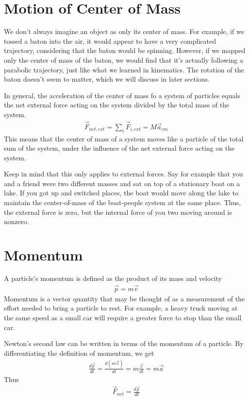 \documentclass[11pt]{article}
\begin{document}
\section{Motion of Center of Mass}

We don't always imagine an object as only its center of mass. For example, if we tossed a baton into the air, it would appear to have a very complicated trajectory, considering that the baton would be spinning. However, if we mapped only the center of mass of the baton, we would find that it's actually following a parabolic trajectory, just like what we learned in kinematics. The rotation of the baton doesn't seem to matter, which we will discuss in later sections.

In general, the acceleration of the center of mass fo a system of particles equals the net external force acting on the system divided by the total mass of the system. 
\begin{align*}
    \Vec{F}_{net,ext} = \sum_i \Vec{F}_{i,ext} = M\Vec{a}_{cm}
\end{align*}
This means that the center of mass of a system moves like a particle of the total sum of the system, under the influence of the net external force acting on the system.

Keep in mind that this only applies to external forces. Say for example that you and a friend were two different masses and sat on top of a stationary boat on a lake. If you got up and switched places, the boat would move along the lake to maintain the center-of-mass of the boat-people system at the same place. Thus, the external force is zero, but the internal force of you two moving around is nonzero.

\section{Momentum}

A particle's momentum is defined as the product of its mass and velocity
\begin{align*}
    \Vec{p} = m\Vec{v}
\end{align*}
Momentum is a vector quantity that may be thought of as a measurement of the effort needed to bring a particle to rest. For example, a heavy truck moving at the same speed as a small car will require a greater force to stop than the small car. 

Newton's second law can be written in terms of the momentum of a particle. By differentiating the definition of momentum, we get
\begin{align}
    \frac{d\Vec{p}}{dt} = \frac{d(m\Vec{v})}{dt} = m \frac{\Vec{v}}{dt} = m\Vec{a}
\end{align}
Thus
\begin{align*}
    \Vec{F}_{net} = \frac{d\Vec{p}}{dt}
\end{align*}
\end{document}
